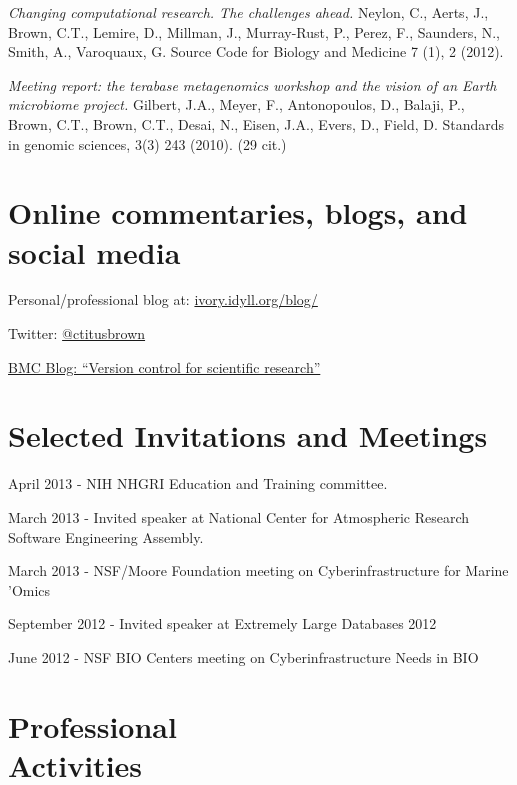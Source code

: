 \documentclass[margin,line]{resume}
\begin{document}
\begin{resume}
{\em Changing computational research. The challenges ahead.}
Neylon, C., Aerts, J., Brown, C.T., Lemire, D., Millman, J., Murray-Rust, P., Perez, F., Saunders, N., Smith, A., Varoquaux, G.
Source Code for Biology and Medicine 7 (1), 2 (2012).

{\em Meeting report: the terabase metagenomics workshop and the vision of an Earth microbiome project.}
Gilbert, J.A., Meyer, F., Antonopoulos, D., Balaji, P., Brown, C.T., Brown, C.T., Desai, N., Eisen, J.A., Evers, D., Field, D. Standards in genomic sciences, 3(3) 243 (2010). (29 cit.)

\section{\mysidestyle Online commentaries, blogs, and social media}

Personal/professional blog at: \href{http://ivory.idyll.org/blog/}{ivory.idyll.org/blog/}

Twitter: \href{http://twitter.com/ctitusbrown}{@ctitusbrown}

\href{http://blogs.biomedcentral.com/bmcblog/2013/02/28/version-control-for-scientific-research/}{BMC Blog: ``Version control for scientific research''}

\section{\mysidestyle Selected Invitations and Meetings}

\begin{list1}

\item[] April 2013 - NIH NHGRI Education and Training committee.
\item[] March 2013 - Invited speaker at National Center for Atmospheric Research Software Engineering Assembly.
\item[] March 2013 - NSF/Moore Foundation meeting on Cyberinfrastructure for Marine 'Omics 
\item[] September 2012 - Invited speaker at Extremely Large Databases 2012
\item[] June 2012 - NSF BIO Centers meeting on Cyberinfrastructure Needs in BIO

\end{list1}

    \section{\mysidestyle Professional\\Activities}


\end{resume}
\end{document}

